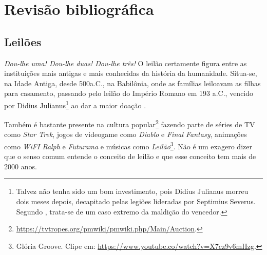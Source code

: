 

\chapter{Revisão bibliográfica}
\label{cap:revisao}

\section{Leilões}

\emph{Dou-lhe uma! Dou-lhe duas! Dou-lhe três!} O leilão certamente figura entre as instituições mais antigas e mais conhecidas da história da humanidade. Situa-se, na Idade Antiga, desde 500a.C., na Babilônia, onde as famílias leiloavam as filhas para casamento, passando pelo leilão do Império Romano em 193 a.C., vencido por Didius Julianus\footnote{Talvez não tenha sido um bom investimento, pois Didius Julianus morreu dois meses depois, decapitado pelas legiões lideradas por Septimius Severus. Segundo \citet{krishna}, trata-se de um caso extremo da maldição do vencedor.} ao dar a maior doação \citet{Cassady2021-ac}.

Também é bastante presente na cultura popular\footnote{\url{https://tvtropes.org/pmwiki/pmwiki.php/Main/Auction}.} fazendo parte de séries de TV como \emph{Star Trek}, jogos de videogame como \emph{Diablo} e \emph{Final Fantasy}, animações como \emph{WiFI Ralph} e \emph{Futurama} e músicas como \emph{Leilão}\footnote{Glória Groove. Clipe em: \url{https://www.youtube.co/watch?v=X7cz9v6mHzg}.}. Não é um exagero dizer que o senso comum entende o conceito de leilão e que esse conceito tem mais de 2000 anos.

